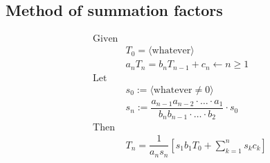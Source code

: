 \subsection{Method of summation factors}
\begin{align*}
\text{Given} \\
& T_0 = \langle \text{whatever} \rangle \\ 
& a_n T_n = b_n T_{n-1} + c_n \leftarrow n \geq 1\\
\text{Let} \\  
& s_0 := \langle \text{whatever} \neq 0 \rangle \\
& s_n := \dfrac{a_{n-1} a_{n-2} \cdot \ldots \cdot a_{1}}{b_{n} b_{n-1} \cdot \ldots \cdot b_{2}} \cdot s_0 \\
\text{Then} \\
&T_n = \dfrac{1}{a_n s_n} \left[ s_1 b_1 T_0 + \sum_{k=1}^{n} s_k c_k \right] 
\end{align*}

